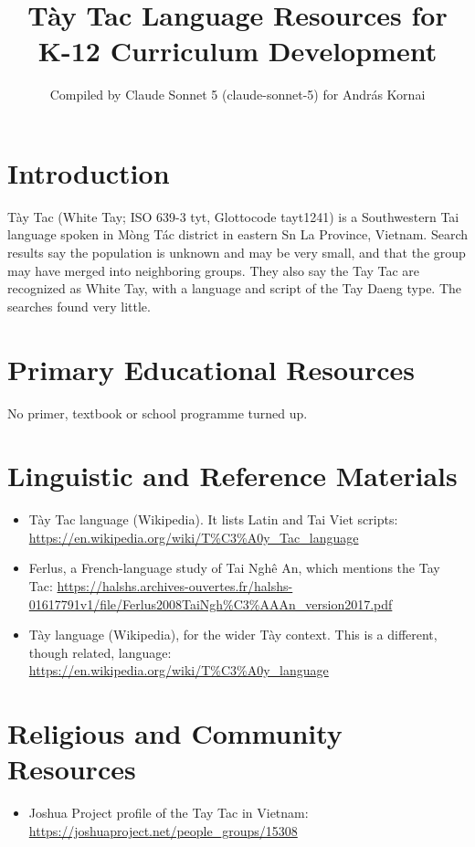\documentclass[12pt]{article}
\title{T\`ay Tac Language Resources for K-12 Curriculum Development}
\author{Compiled by Claude Sonnet 5 (claude-sonnet-5) for Andr\'as Kornai}
\date{}
\begin{document}
\maketitle

\section{Introduction}
T\`ay Tac (White Tay; ISO 639-3 tyt, Glottocode tayt1241) is a Southwestern Tai language spoken in M\uhorn{}\`ong T\'ac district in eastern S\ohorn{}n La Province, Vietnam. Search results say the population is unknown and may be very small, and that the group may have merged into neighboring groups. They also say the Tay Tac are recognized as White Tay, with a language and script of the Tay Daeng type. The searches found very little.

\section{Primary Educational Resources}
No primer, textbook or school programme turned up.

\section{Linguistic and Reference Materials}
\begin{itemize}
\item T\`ay Tac language (Wikipedia). It lists Latin and Tai Viet scripts: \url{https://en.wikipedia.org/wiki/T%C3%A0y_Tac_language}
\item Ferlus, a French-language study of Tai Ngh\^e An, which mentions the Tay Tac: \url{https://halshs.archives-ouvertes.fr/halshs-01617791v1/file/Ferlus2008TaiNgh%C3%AAAn_version2017.pdf}
\item T\`ay language (Wikipedia), for the wider T\`ay context. This is a different, though related, language: \url{https://en.wikipedia.org/wiki/T%C3%A0y_language}
\end{itemize}

\section{Religious and Community Resources}
\begin{itemize}
\item Joshua Project profile of the Tay Tac in Vietnam: \url{https://joshuaproject.net/people_groups/15308}
\end{itemize}
\end{document}
